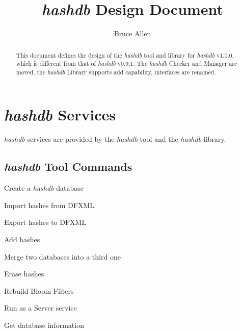 \documentclass[12pt,twoside]{article}
\newcommand{\hdb}{\emph{hashdb}\xspace}
\begin{document}
\title{\hdb Design Document}
\author{Bruce Allen}
\maketitle

\begin{abstract}
This document defines the design of the \hdb tool and library
for \hdb v1.0.0, which is different from that of \hdb v0.9.1.
The \hdb Checker and Manager are moved,
the \hdb Library supports add capability,
interfaces are renamed.
\end{abstract}

\section{\hdb Services}
\hdb services are provided by the \hdb tool and the \hdb library.
\subsection{\hdb Tool Commands}
\begin{compactitem}
\item Create a \hdb database
\item Import hashes from DFXML
\item Export hashes to DFXML
\item Add hashes
\item Merge two databases into a third one
\item Erase hashes
\item Rebuild Bloom Filters
\item Run as a Server service
\item Get database information
\end{compactitem}
\end{document}
